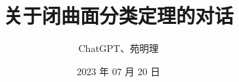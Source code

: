 \documentclass[
    fontsize=24pt, %
	twoside=false, %
	secnumdepth=0, %
    paper=b5paper, %
]{kaobook}
\begin{document}

\titlehead{暑期探索项目}
\title[Template for the {\normalfont\texttt{kaobook}} Class]{关于闭曲面分类定理的对话}
\author{ChatGPT、苑明理}
\date{2023 年 07 月 20 日}
\publishers{暑期探索项目}


% 

\frontmatter %


\dedication{
	想象力是灵魂的眼睛。 \flushright —— 约瑟夫 · 朱伯特
}


\maketitle



\end{document}
